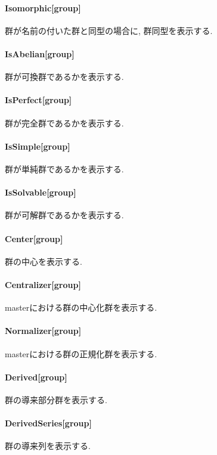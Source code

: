 \documentclass[11pt, a4paper]{jsarticle}
\begin{document}
\paragraph{Isomorphic[group]}
群が名前の付いた群と同型の場合に, 群同型を表示する.

\paragraph{IsAbelian[group]}
群が可換群であるかを表示する.

\paragraph{IsPerfect[group]}
群が完全群であるかを表示する.

\paragraph{IsSimple[group]}
群が単純群であるかを表示する.

\paragraph{IsSolvable[group]}
群が可解群であるかを表示する.

\paragraph{Center[group]}
群の中心を表示する.

\paragraph{Centralizer[group]}
masterにおける群の中心化群を表示する.

\paragraph{Normalizer[group]}
masterにおける群の正規化群を表示する.

\paragraph{Derived[group]}
群の導来部分群を表示する.

\paragraph{DerivedSeries[group]}
群の導来列を表示する.
\end{document}
